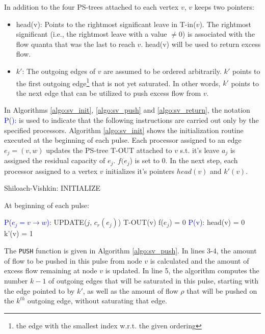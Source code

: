 \documentclass[a4paper,10pt, twocolumn]{article}
\begin{document}
In addition to the four PS-trees attached to each vertex $v$, $v$ keeps two pointers:
\begin{itemize}
	\item head(v): Points to the rightmost significant leave in T-in($v$). The rightmost significant (i.e., the rightmost leave with a value $\neq 0$) is associated with the flow quanta that was the last to reach $v$. head(v) will be used to return excess flow. 
	\item $k'$: The outgoing edges of $v$ are assumed to be ordered arbitrarily. $k'$ points to the first outgoing edge\footnote{the edge with the smallest index w.r.t. the given ordering} that is not yet saturated. In other words, $k'$ points to the next edge that can be utilized to push excess flow from $v$.  
\end{itemize}

In Algorithms \ref{algo:sv_init}, \ref{algo:sv_push} and \ref{algo:sv_return}, the notation \textcolor{blue}{P():} is used to indicate that the following instructions are carried out only by the specified processors. Algorithm \ref{algo:sv_init} shows the initialization routine executed at the beginning of each pulse. Each processor assigned to an edge $e_j = (v, w)$ updates the PS-tree T-OUT attached to $v$ s.t. it's leave $a_j$ is assigned the residual capacity of $e_j$. $f(e_j$) is set to 0. In the next step, each processor assigned to a vertex $v$ initializes it's pointers $head(v)$ and $k'(v)$.

\begin{algorithm}
\caption{Shiloach-Vishkin: INITIALIZE}
\label{algo:sv_init}
At beginning of each pulse:	
\begin{algorithmic}[1]
		\State \textcolor{blue}{P($e_j = v \rightarrow w$):}
		\State UPDATE($j$, $c_r(e_j)$) T-OUT(v)
		\State f($e_j$) = 0
		\State \textcolor{blue}{P(v):}
		\State head(v) = 0	
		\State k'(v) = 1	
 	\EndFunction
\end{algorithmic}
\end{algorithm}

The \lstinline|PUSH| function is given in Algorithm \ref{algo:sv_push}. In lines 3-4, the amount of flow to be pushed in this pulse from node $v$ is calculated and the amount of excess flow remaining at node $v$ is updated. In line 5, the algorithm computes the number $k-1$ of outgoing edges that will be saturated in this pulse, starting with the edge pointed to by $k'$, as well as the amount of flow $\rho$ that will be pushed on the $k^{th}$ outgoing edge, without saturating that edge.
\end{document}

